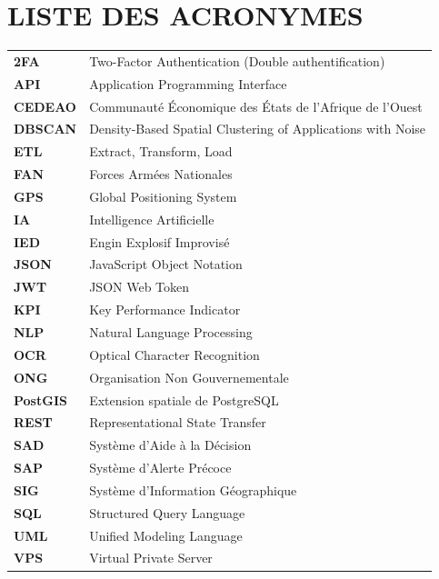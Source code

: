 \documentclass[12pt,a4paper]{article}
\begin{document}
\section*{LISTE DES ACRONYMES}
\vspace{1cm}
\begin{longtable}{p{3cm}p{10cm}}
\textbf{2FA} & Two-Factor Authentication (Double authentification) \\
\textbf{API} & Application Programming Interface \\
\textbf{CEDEAO} & Communauté Économique des États de l'Afrique de l'Ouest \\
\textbf{DBSCAN} & Density-Based Spatial Clustering of Applications with Noise \\
\textbf{ETL} & Extract, Transform, Load \\
\textbf{FAN} & Forces Armées Nationales \\
\textbf{GPS} & Global Positioning System \\
\textbf{IA} & Intelligence Artificielle \\
\textbf{IED} & Engin Explosif Improvisé \\
\textbf{JSON} & JavaScript Object Notation \\
\textbf{JWT} & JSON Web Token \\
\textbf{KPI} & Key Performance Indicator \\
\textbf{NLP} & Natural Language Processing \\
\textbf{OCR} & Optical Character Recognition \\
\textbf{ONG} & Organisation Non Gouvernementale \\
\textbf{PostGIS} & Extension spatiale de PostgreSQL \\
\textbf{REST} & Representational State Transfer \\
\textbf{SAD} & Système d'Aide à la Décision \\
\textbf{SAP} & Système d'Alerte Précoce \\
\textbf{SIG} & Système d'Information Géographique \\
\textbf{SQL} & Structured Query Language \\
\textbf{UML} & Unified Modeling Language \\
\textbf{VPS} & Virtual Private Server \\
\end{longtable}

\newpage
{}
{}
\listoftables
\end{document}
